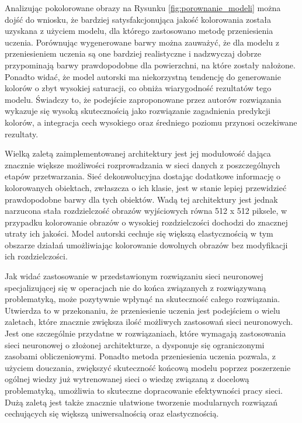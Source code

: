   Analizując pokolorowane obrazy na Rysunku \ref{fig:porownanie_modeli} można
  dojść do wniosku, że bardziej satysfakcjonująca jakość kolorowania została uzyskana z
  użyciem modelu, dla którego zastosowano metodę przeniesienia uczenia.
  Porównując wygenerowane barwy można zauważyć, że dla modelu z przeniesieniem
  uczenia są one bardziej realistyczne i nadzwyczaj dobrze przypominają barwy
  prawdopodobne dla powierzchni, na które zostały nałożone. Ponadto widać, że
  model autorski ma niekorzystną tendencję do generowanie kolorów o zbyt wysokiej
  saturacji, co obniża wiarygodność rezultatów tego modelu.
  Świadczy to, że podejście zaproponowane
  przez autorów rozwiązania wykazuje się wysoką skutecznością jako rozwiązanie
  zagadnienia predykcji kolorów, a integracja cech wysokiego oraz średniego poziomu
  przynosi oczekiwane rezultaty.

  Wielką zaletą zaimplementowanej architektury jest jej modułowość dająca znacznie
  większe możliwości rozprowadzania w sieci danych z poszczególnych etapów przetwarzania.
  Sieć dekonwolucyjna dostając dodatkowe informację o kolorowanych obiektach,
  zwłaszcza o ich klasie, jest w stanie lepiej przewidzieć prawdopodobne barwy dla
  tych obiektów.
  Wadą tej architektury jest jednak narzucona stała rozdzielczość obrazów
  wyjściowych równa 512 x 512 piksele, w przypadku kolorowanie obrazów o wysokiej
  rozdzielczości dochodzi do znacznej utraty ich jakości. Model autorski cechuje się
  większą elastycznością w tym obszarze działań umożliwiając kolorowanie dowolnych obrazów
  bez modyfikacji ich rozdzielczości.

  Jak widać zastosowanie w przedstawionym rozwiązaniu sieci neuronowej
  specjalizującej się w operacjach nie do końca związanych z rozwiązywaną
  problematyką, może pozytywnie wpłynąć na skuteczność całego rozwiązania.
  Utwierdza to w przekonaniu, że przeniesienie uczenia jest podejściem o wielu
  zaletach, które znacznie zwiększa ilość możliwych zastosowań sieci neuronowych.
  Jest one szczególnie przydatne w rozwiązaniach, które wymagają
  zastosowania sieci neuronowej o złożonej architekturze, a dysponuje się ograniczonymi
  zasobami obliczeniowymi.
  Ponadto metoda przeniesienia uczenia pozwala, z użyciem douczania, zwiększyć
  skuteczność końcową modelu poprzez poszerzenie ogólnej wiedzy już wytrenowanej
  sieci o wiedzę związaną z docelową problematyką, umożliwia to skuteczne
  dopracowanie efektywności pracy sieci.
  Dużą zaletą jest także znacznie ułatwione tworzenie modularnych
  rozwiązań cechujących się większą uniwersalnością oraz elastycznością.


